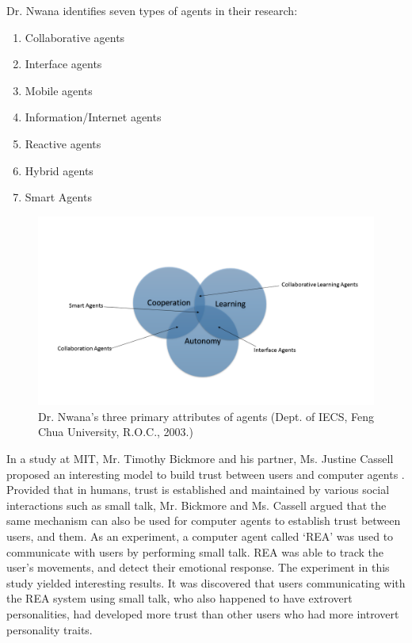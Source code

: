 \documentclass[runningheads,a4paper]{llncs}
\begin{document}
Dr. Nwana identifies seven types of agents in their research:
\begin{enumerate}
	\item Collaborative agents
	\item Interface agents
	\item Mobile agents
	\item Information/Internet agents
	\item Reactive agents
	\item Hybrid agents
	\item Smart Agents
\end{enumerate}

\begin{figure}
	\centering
		\includegraphics[width=\textwidth]{Figures/agents.png}
	\caption{Dr. Nwana's three primary attributes of agents (Dept. of IECS, Feng Chua University, R.O.C., 2003.)}
\end{figure}

In a study at MIT, Mr. Timothy Bickmore and his partner, Ms. Justine Cassell proposed an interesting model to build trust between users and computer agents \cite{bickmore2001relational}. Provided that in humans, trust is established and maintained by various social interactions such as small talk, Mr. Bickmore and Ms. Cassell argued that the same mechanism can also be used for computer agents to establish trust between users, and them. As an experiment, a computer agent called `REA' was used to communicate with users by performing small talk. REA was able to track the user's movements, and detect their emotional response. The experiment in this study yielded interesting results. It was discovered that users communicating with the REA system using small talk, who also happened to have extrovert personalities, had developed more trust than other users who had more introvert personality traits.
\end{document}
